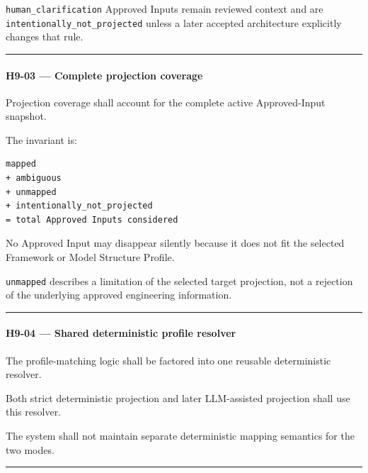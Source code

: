 \texttt{human\_clarification} Approved Inputs remain reviewed context and are \texttt{intentionally\_not\_projected} unless a later accepted architecture explicitly changes that rule.

\begin{center}\rule{0.5\linewidth}{0.5pt}\end{center}

\hypertarget{h9-03--complete-projection-coverage}{%
\paragraph{H9-03 --- Complete projection coverage}\label{h9-03--complete-projection-coverage}}

Projection coverage shall account for the complete active Approved-Input snapshot.

The invariant is:

\begin{verbatim}
mapped
+ ambiguous
+ unmapped
+ intentionally_not_projected
= total Approved Inputs considered
\end{verbatim}

No Approved Input may disappear silently because it does not fit the selected Framework or Model Structure Profile.

\texttt{unmapped} describes a limitation of the selected target projection, not a rejection of the underlying approved engineering information.

\begin{center}\rule{0.5\linewidth}{0.5pt}\end{center}

\hypertarget{h9-04--shared-deterministic-profile-resolver}{%
\paragraph{H9-04 --- Shared deterministic profile resolver}\label{h9-04--shared-deterministic-profile-resolver}}

The profile-matching logic shall be factored into one reusable deterministic resolver.

Both strict deterministic projection and later LLM-assisted projection shall use this resolver.

The system shall not maintain separate deterministic mapping semantics for the two modes.

\begin{center}\rule{0.5\linewidth}{0.5pt}\end{center}

